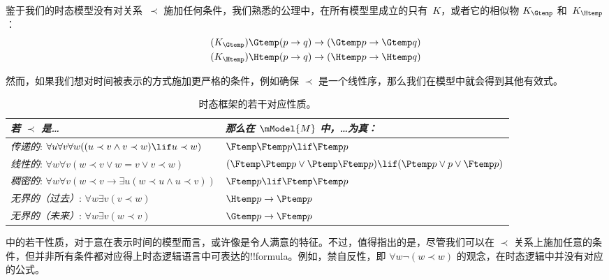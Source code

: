 \documentclass[../../../include/open-logic-section]{subfiles}
\begin{document}


鉴于我们的时态模型没有对关系~$\prec$ 施加任何条件，我们熟悉的公理中，在所有模型里成立的只有~$K$，或者它的相似物 $K_{\Gtemp}$ 和~$K_{\Htemp}$：
\begin{align*}
\tag{$K_{\Gtemp}$}  \Gtemp (p \to q) & \to (\Gtemp p \to \Gtemp q)\\
\tag{$K_{\Htemp}$}  \Htemp (p \to q) & \to (\Htemp p \to \Htemp q)
\end{align*}

然而，如果我们想对时间被表示的方式施加更严格的条件，例如确保 $\prec$ 是一个线性序，那么我们在模型中就会得到其他有效式。

\begin{table}[t]
  \begin{tabular}{| p{} || p{} |}
    \hline
    {\emph{若 $\prec$ 是\dots}} & {\emph{那么在 $\mModel{M}$ 中，\dots 为真：}} \\
    \hline \hline
    \emph{传递的}: \newline
    $\forall u \forall v \forall w ((u \prec v \land v \prec w) \lif u \prec w)$ &
    $\Ftemp \Ftemp p \lif \Ftemp p$  \\
    \hline
    \emph{线性的}: \newline
    $\forall w \forall v (w \prec v \lor w = v \lor v \prec w)$ &
    $(\Ftemp \Ptemp  p \lor \Ptemp \Ftemp p) \lif (\Ptemp p \lor p \lor \Ftemp p)$\\
    \hline
    \emph{稠密的}: \newline
    $\forall w \forall v (w \prec v \to \exists u(w \prec u \land u \prec v))$ &
    $\Ftemp p \lif \Ftemp \Ftemp p$ \\
    \hline
    \emph{无界的（过去）}: \newline
    $\forall w \exists v( v \prec w)$ &
    $\Htemp p \to \Ptemp p$ \\
    \hline
    \emph{无界的（未来）}: \newline
    $\forall w \exists v( w \prec v)$ &
    $\Gtemp p \to \Ftemp p$ \\
    \hline
  \end{tabular}
  \caption{时态框架的若干对应性质。}
\end{table}

 中的若干性质，对于意在表示时间的模型而言，或许像是令人满意的特征。不过，值得指出的是，尽管我们可以在 $\prec$ 关系上施加任意的条件，但并非所有条件都对应得上时态逻辑语言中可表达的!!{formula}。例如，禁自反性，即 $\forall w \lnot (w \prec w)$ 的观念，在时态逻辑中并没有对应的公式。
\end{document}

